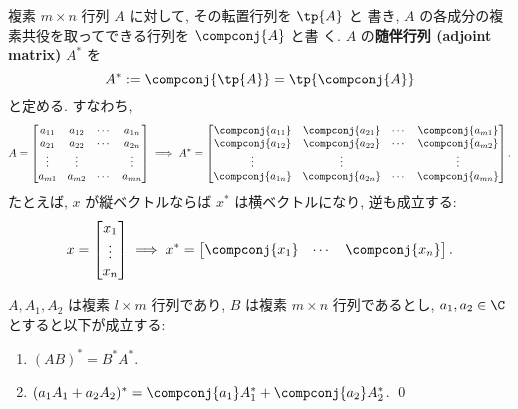 \documentclass[12pt,twoside]{jarticle}
\begin{document}
複素 $m\times n$ 行列 $A$ に対して, その転置行列を $\tp{A}$ と
書き, $A$ の各成分の複素共役を取ってできる行列を $\compconj{A}$ と書
く. $A$ の{\bf 随伴行列 (adjoint matrix)} $A^*$ を
\begin{equation*}
  A^* := \compconj{\tp{A}} = \tp{\compconj{A}}
\end{equation*}
と定める. すなわち,
\begin{equation*}
  A =
  \begin{bmatrix}
    a_{11} & a_{12} & \cdots & a_{1n} \\
    a_{21} & a_{22} & \cdots & a_{2n} \\
    \vdots & \vdots &        & \vdots \\
    a_{m1} & a_{m2} & \cdots & a_{mn} \\
  \end{bmatrix}
  \implies
  A^* =
  \begin{bmatrix}
    \compconj{a_{11}} & \compconj{a_{21}} & \cdots & \compconj{a_{m1}} \\
    \compconj{a_{12}} & \compconj{a_{22}} & \cdots & \compconj{a_{m2}} \\
    \vdots            & \vdots            &        & \vdots \\
    \compconj{a_{1n}} & \compconj{a_{2n}} & \cdots & \compconj{a_{mn}} \\
  \end{bmatrix}.
\end{equation*}
たとえば, $x$ が縦ベクトルならば $x^*$ は横ベクトルになり, 逆も成立する:
\begin{equation*}
  x = 
  \begin{bmatrix}
    x_1 \\ \vdots \\ x_n
  \end{bmatrix}
  \implies
  x^* = 
  \begin{bmatrix}
    \compconj{x_1} & \cdots & \compconj{x_n}
  \end{bmatrix}.
\end{equation*}


\begin{question}
  $A,A_1,A_2$ は複素 $l\times m$ 行列であり, 
  $B$ は複素 $m\times n$ 行列であるとし,
  $a_1,a_2\in\C$ とすると以下が成立する:
  \begin{enumerate}
  \item $(AB)^* = B^*A^*$.
  \item $(a_1A_1+a_2A_2)^* = \compconj{a_1}A_1^* + \compconj{a_2}A_2^*$.
    \qed
  \end{enumerate}
\end{question}
\end{document}
